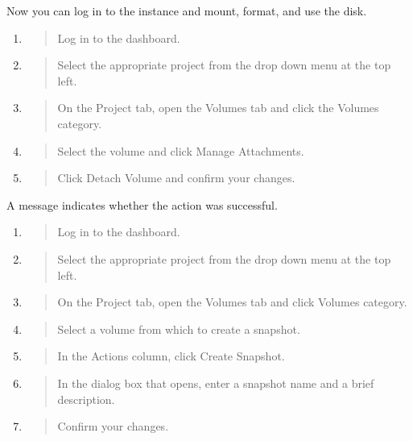 Now you can log in to the instance and mount, format, and use the disk.

\label{detach-a-volume-from-an-instance}

\begin{enumerate}
\def\labelenumi{\arabic{enumi}.}
\item
  \begin{quote}
  Log in to the dashboard.
  \end{quote}
\item
  \begin{quote}
  Select the appropriate project from the drop down menu at the top
  left.
  \end{quote}
\item
  \begin{quote}
  On the Project tab, open the Volumes tab and click the Volumes
  category.
  \end{quote}
\item
  \begin{quote}
  Select the volume and click Manage Attachments.
  \end{quote}
\item
  \begin{quote}
  Click Detach Volume and confirm your changes.
  \end{quote}
\end{enumerate}

A message indicates whether the action was successful.

\label{create-a-snapshot-from-a-volume}

\begin{enumerate}
\def\labelenumi{\arabic{enumi}.}
\item
  \begin{quote}
  Log in to the dashboard.
  \end{quote}
\item
  \begin{quote}
  Select the appropriate project from the drop down menu at the top
  left.
  \end{quote}
\item
  \begin{quote}
  On the Project tab, open the Volumes tab and click Volumes category.
  \end{quote}
\item
  \begin{quote}
  Select a volume from which to create a snapshot.
  \end{quote}
\item
  \begin{quote}
  In the Actions column, click Create Snapshot.
  \end{quote}
\item
  \begin{quote}
  In the dialog box that opens, enter a snapshot name and a brief
  description.
  \end{quote}
\item
  \begin{quote}
  Confirm your changes.
  \end{quote}
\end{enumerate}

